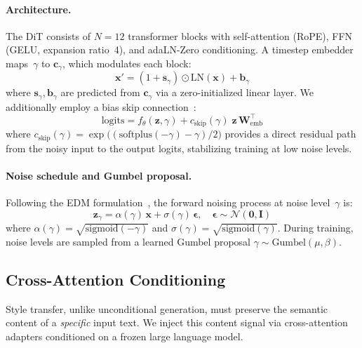 \paragraph{Architecture.}
The DiT consists of $N{=}12$ transformer blocks with
self-attention (RoPE), FFN (GELU, expansion ratio~4), and
adaLN-Zero conditioning.
A timestep embedder maps~$\gamma$ to
$\mathbf{c}_\gamma$, which modulates each block:
\begin{equation}
    \mathbf{x}'
      = (1 + \mathbf{s}_\gamma)
        \odot \mathrm{LN}(\mathbf{x})
        + \mathbf{b}_\gamma
\end{equation}
where $\mathbf{s}_\gamma, \mathbf{b}_\gamma$ are predicted from
$\mathbf{c}_\gamma$ via a zero-initialized linear layer.
We additionally employ a bias skip
connection~\citep{karras2022elucidating}:
\begin{equation}
    \mathrm{logits}
      = f_\theta(\mathbf{z},\gamma)
        + c_{\mathrm{skip}}(\gamma)
          \;\mathbf{z}\,\mathbf{W}_{\mathrm{emb}}^\top
\end{equation}
where
$c_{\mathrm{skip}}(\gamma)
  = \exp\bigl((\mathrm{softplus}(-\gamma)-\gamma)/2\bigr)$
provides a direct residual path from the noisy input to the
output logits, stabilizing training at low noise levels.

\paragraph{Noise schedule and Gumbel proposal.}
Following the EDM formulation~\citep{karras2022elucidating},
the forward noising process at noise level~$\gamma$ is:
\begin{equation}
    \mathbf{z}_\gamma
      = \alpha(\gamma)\,\mathbf{x}
      + \sigma(\gamma)\,\boldsymbol{\epsilon},
    \quad
    \boldsymbol{\epsilon}\sim\mathcal{N}(\mathbf{0},\mathbf{I})
    \label{eq:noise}
\end{equation}
where $\alpha(\gamma) = \sqrt{\mathrm{sigmoid}(-\gamma)}$ and
$\sigma(\gamma) = \sqrt{\mathrm{sigmoid}(\gamma)}$.
During training, noise levels are sampled from a learned Gumbel
proposal
$\gamma \sim \mathrm{Gumbel}(\mu, \beta)$.

\subsection{Cross-Attention Conditioning}
\label{sec:conditioning}

Style transfer, unlike unconditional generation, must preserve
the semantic content of a \emph{specific} input text.
We inject this content signal via cross-attention adapters
conditioned on a frozen large language model.

